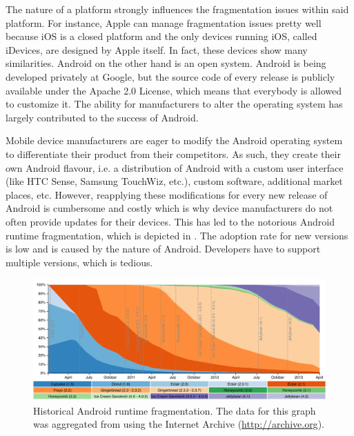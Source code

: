 The nature of a platform strongly influences the fragmentation issues within said platform. For instance, Apple can manage fragmentation issues pretty well because iOS is a closed platform and the only devices running iOS, called iDevices, are designed by Apple itself. In fact, these devices show many similarities. Android on the other hand is an open system. Android is being developed privately at Google, but the source code of every release is publicly available under the Apache 2.0 License, which means that everybody is allowed to customize it. The ability for manufacturers to alter the operating system has largely contributed to the success of Android. 

Mobile device manufacturers are eager to modify the Android operating system to differentiate their product from their competitors. As such, they create their own Android flavour, i.e. a distribution of Android with a custom user interface (like HTC Sense, Samsung TouchWiz, etc.), custom software, additional market places, etc. However, reapplying these modifications for every new release of Android is cumbersome and costly which is why device manufacturers do not often provide updates for their devices. This has led to the notorious Android runtime fragmentation, which is depicted in . The adoption rate for new versions is low and is caused by the nature of Android. Developers have to support multiple versions, which is tedious. 

\begin{figure}[h]
    \begin{center}
        \includegraphics[width=\textwidth]{figs/android_runtimes.pdf}
        \caption{Historical Android runtime fragmentation. The data for this graph was aggregated from \cite{Android:Versions} using the Internet Archive (\url{http://archive.org}).}
        \label{fig:android_runtimes}
    \end{center}
\end{figure}

